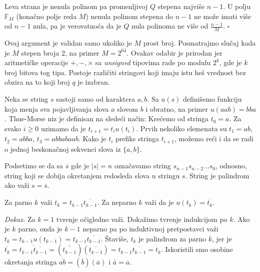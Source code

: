 
Leva strana je nenula polinom pa promenljivoj $Q$ stepena najvi\v se $n-1$. U polju $\mathbb{F}_M$ (kona\v cno polje reda $M$) nenula polinom stepena do $n-1$ ne mo\v ze imati vi\v se od $n-1$ nula, pa je verovatno\' ca da je $Q$ nula polinoma ne vi\v se od $\frac{n-1}{M}$. \hfill $\square$

Ovaj argument je validan samo ukoliko je $M$ prost broj. Posmatrajmo slu\v caj kada je $M$ stepen broja $2$, na primer $M = 2^{64}$. Ovakav odabir je prirodan jer aritmeti\v cke operacije $+,-,\times$ sa \textit{unsigned} tipovima rade po modulu $2^k$, gde je $k$ broj bitova tog tipa. Postoje razli\v citi stringovi koji imaju istu he\v s vrednost bez obzira na to koji broj $q$ je izabran.

Neka se string $s$ sastoji samo od karaktera $a,b$. Sa $u(s)$ defini\v semo funkciju koja menja sva pojavljivanja slova $a$ slovom $b$ i obratno, na primer $u(aab) = bba$. Thue-Morse niz\cite{thuemorserad} je definisan na slede\' ci na\v cin: Kre\' cemo od stringa $t_0 = a$. Za svako $i \geq 0$ uzimamo da je $t_{i+1} = t_iu(t_i)$. Prvih nekoliko elemenata su $t_1 = ab$, $t_2 = abba$, $t_3 = abbabaab$. Kako je $t_i$ prefiks stringa $t_{i+1}$, mo\v zemo re\' ci i da se radi o jednoj beskona\v cnoj sekvenci slova iz $\{a,b\}$.

Podsetimo se da sa $\overline{s}$ gde je $|s|=n$ ozna\v cavamo string $s_{n-1}s_{n-2}\ldots s_0$, odnosno, string koji se dobija okretanjem redosleda slova u stringu $s$. String je palindrom ako va\v zi $s = \overline{s}$.

\begin{thm}
\label{thuemorseosobina}
Za parno $k$ va\v zi $t_k = t_{k-1}\overline{t_{k-1}}$. Za neparno $k$ va\v zi da je $u(t_{k}) = \overline{t_{k}}$.
\end{thm}

\textit{Dokaz.} Za $k=1$ tvr\dj enje o\v cigledno va\v zi. Doka\v zimo tvr\dj enje indukcijom po $k$. Ako je $k$ parno, onda je $k-1$ neparno pa po induktivnoj pretpostavci va\v zi $t_k = t_{k-1}u(t_{k-1}) = t_{k-1}\overline{t_{k-1}}$. \v Stavi\v se, $t_k$ je palindrom za parno $k$, jer je $\overline{t_k} = \overline{t_{k-1}\overline{t_{k-1}}} = (\overline{\overline{t_{k-1}}})(\overline{t_{k-1}}) = t_{k-1}\overline{t_{k-1}} = t_k$. Iskoristili smo osobine okretanja stringa $\overline{ab} = (\overline{b})(\overline{a})$ i $\overline{\overline{a}} = a$.

